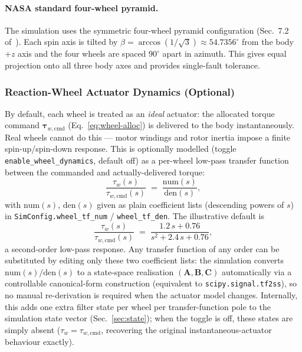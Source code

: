\paragraph{NASA standard four-wheel pyramid.}
The simulation uses the symmetric four-wheel pyramid configuration
(Sec.~7.2 of~\cite{markley2014}). Each spin axis is tilted by
$\beta = \arccos(1/\sqrt{3}) \approx 54.7356^\circ$ from the body $+z$
axis and the four wheels are spaced $90^\circ$ apart in azimuth. This
gives equal projection onto all three body axes and provides
single-fault tolerance.

\subsubsection{Reaction-Wheel Actuator Dynamics (Optional)}
\label{sec:wheel-actuator}

By default, each wheel is treated as an \emph{ideal} actuator: the
allocated torque command $\bm{\tau}_{w,\text{cmd}}$ (Eq.~\ref{eq:wheel-alloc})
is delivered to the body instantaneously. Real wheels cannot do this ---
motor windings and rotor inertia impose a finite spin-up/spin-down
response. This is optionally modelled (toggle \texttt{enable\_wheel\_dynamics},
default off) as a per-wheel low-pass transfer function between the
commanded and actually-delivered torque:
\begin{equation}
\frac{\tau_{w}(s)}{\tau_{w,\text{cmd}}(s)}
\;=\;
\frac{\text{num}(s)}{\text{den}(s)},
\label{eq:wheel-tf}
\end{equation}
with $\text{num}(s)$, $\text{den}(s)$ given as plain coefficient lists
(descending powers of $s$) in \texttt{SimConfig.wheel\_tf\_num} /
\texttt{wheel\_tf\_den}. The illustrative default is
\begin{equation}
\frac{\tau_w(s)}{\tau_{w,\text{cmd}}(s)}
\;=\;
\frac{1.2\,s + 0.76}{s^2 + 2.4\,s + 0.76},
\label{eq:wheel-tf-example}
\end{equation}
a second-order low-pass response. Any transfer function of any order can
be substituted by editing only these two coefficient lists: the
simulation converts $\text{num}(s)/\text{den}(s)$ to a state-space
realisation $(\bm{A}, \bm{B}, \bm{C})$ automatically via a controllable
canonical-form construction (equivalent to \texttt{scipy.signal.tf2ss}),
so no manual re-derivation is required when the actuator model changes.
Internally, this adds one extra filter state per wheel per transfer-function
pole to the simulation state vector (Sec.~\ref{sec:state}); when the toggle
is off, these states are simply absent ($\tau_w = \tau_{w,\text{cmd}}$,
recovering the original instantaneous-actuator behaviour exactly).


